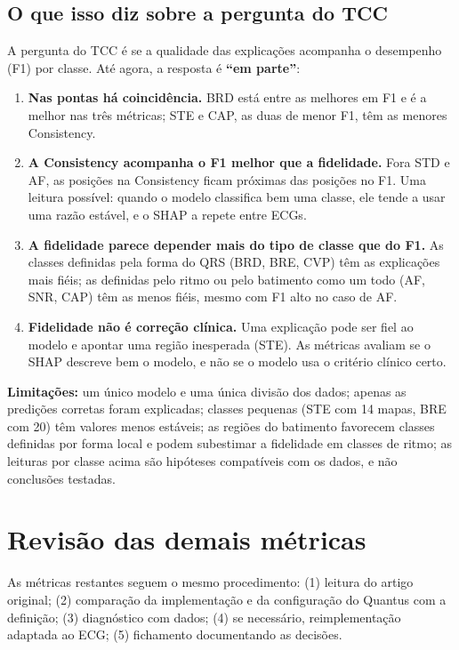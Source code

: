 \documentclass[11pt,a4paper]{article}
\begin{document}
\subsection{O que isso diz sobre a pergunta do TCC}
A pergunta do TCC é se a qualidade das explicações acompanha o desempenho (F1) por classe. Até agora, a resposta é \textbf{“em parte”}:
\begin{enumerate}
    \item \textbf{Nas pontas há coincidência.} BRD está entre as melhores em F1 e é a melhor nas três métricas; STE e CAP, as duas de menor F1, têm as menores Consistency.
    \item \textbf{A Consistency acompanha o F1 melhor que a fidelidade.} Fora STD e AF, as posições na Consistency ficam próximas das posições no F1. Uma leitura possível: quando o modelo classifica bem uma classe, ele tende a usar uma razão estável, e o SHAP a repete entre ECGs.
    \item \textbf{A fidelidade parece depender mais do tipo de classe que do F1.} As classes definidas pela forma do QRS (BRD, BRE, CVP) têm as explicações mais fiéis; as definidas pelo ritmo ou pelo batimento como um todo (AF, SNR, CAP) têm as menos fiéis, mesmo com F1 alto no caso de AF.
    \item \textbf{Fidelidade não é correção clínica.} Uma explicação pode ser fiel ao modelo e apontar uma região inesperada (STE). As métricas avaliam se o SHAP descreve bem o modelo, e não se o modelo usa o critério clínico certo.
\end{enumerate}

\textbf{Limitações:} um único modelo e uma única divisão dos dados; apenas as predições corretas foram explicadas; classes pequenas (STE com 14 mapas, BRE com 20) têm valores menos estáveis; as regiões do batimento favorecem classes definidas por forma local e podem subestimar a fidelidade em classes de ritmo; as leituras por classe acima são hipóteses compatíveis com os dados, e não conclusões testadas.

\section{Revisão das demais métricas}

As métricas restantes seguem o mesmo procedimento: (1) leitura do artigo original; (2) comparação da implementação e da configuração do Quantus com a definição; (3) diagnóstico com dados; (4) se necessário, reimplementação adaptada ao ECG; (5) fichamento documentando as decisões.
\end{document}
